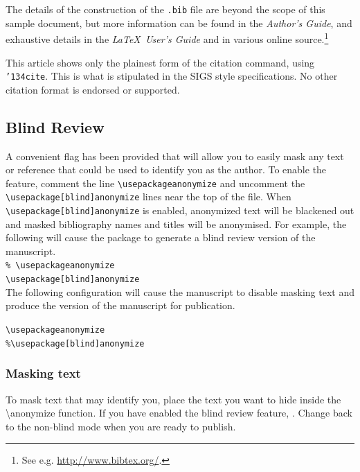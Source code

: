 \documentclass{nime-alternate} %
\begin{document}
The details of the construction of the \texttt{.bib} file
are beyond the scope of this sample document, but more
information can be found in the \textit{Author's Guide},
and exhaustive details in the \textit{\LaTeX\ User's
Guide} \cite{Lamport:LaTeX} and in various online source.\footnote{See e.g. \url{http://www.bibtex.org/}.}

This article shows only the plainest form
of the citation command, using \texttt{{\char'134}cite}.
This is what is stipulated in the SIGS style specifications.
No other citation format is endorsed or supported.

\subsection{Blind Review}
A convenient flag has been provided that will allow you to easily mask any text or reference that could be used to identify you as the author. To enable the feature, comment the line \texttt{\textbackslash usepackage{anonymize}} and uncomment the \texttt{\textbackslash usepackage[blind]{anonymize}} lines near the top of the file. When \texttt{\textbackslash usepackage[blind]{anonymize}} is enabled, anonymized text will be blackened out and masked bibliography names and titles will be anonymised. For example, the following will cause the package to generate a blind review version of the manuscript.\\

\texttt{\% \textbackslash usepackage{anonymize}}  \\
\texttt{\textbackslash usepackage[blind]{anonymize}} \\


The following configuration will cause the manuscript to disable masking text and produce the version of the manuscript for publication.

\texttt{\textbackslash usepackage{anonymize}} \\
\texttt{\%\textbackslash usepackage[blind]{anonymize}} \\

\subsubsection{Masking text}
To mask text that may identify you, place the text you want to hide inside the \textbackslash anonymize function. If you have enabled the blind review feature, . Change back to the non-blind mode when you are ready to publish. 
\end{document}
